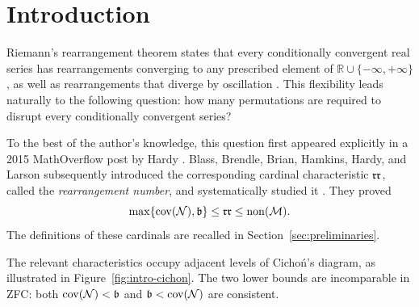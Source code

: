 \section{Introduction}\label{sec:introduction}

Riemann's rearrangement theorem states that every conditionally
convergent real series has rearrangements converging to any prescribed
element of $\mathbb R\cup\{-\infty,+\infty\}$, as well as
rearrangements that diverge by oscillation \cite{Riemann}.  This
flexibility leads naturally to the following question: how many
permutations are required to disrupt every conditionally convergent
series?

To the best of the author's knowledge, this question first appeared
explicitly in a 2015 MathOverflow post by Hardy \cite{HardyMO}.  Blass,
Brendle, Brian, Hamkins, Hardy, and Larson subsequently introduced the
corresponding cardinal characteristic $\mathfrak{rr}$, called the
\emph{rearrangement number}, and systematically studied it
\cite{BBBHHL}.  They proved
\[
 \max\{\operatorname{cov}(\mathcal N),\mathfrak b\}\leq\mathfrak{rr}\leq\operatorname{non}(\mathcal M).
\]
The definitions of these cardinals are recalled in
Section~\ref{sec:preliminaries}.

The relevant characteristics occupy adjacent levels of Cichoń's
diagram, as illustrated in Figure~\ref{fig:intro-cichon}.  The two
lower bounds are incomparable in ZFC: both $\operatorname{cov}(\mathcal N)<\mathfrak b$ and
$\mathfrak b<\operatorname{cov}(\mathcal N)$ are consistent.

